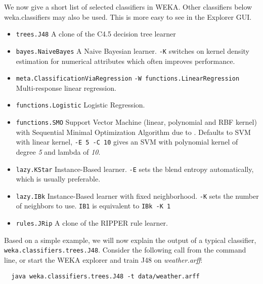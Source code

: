 \vspace{0.5cm}

\noindent We now give a short list of selected classifiers in WEKA. Other classifiers below weka.classifiers may also be used. This is more easy to see in the Explorer GUI.

\begin{itemize}
	\item \texttt{trees.J48} A clone of the C4.5 decision tree learner
	\item \texttt{bayes.NaiveBayes} A Naive Bayesian learner. \texttt{-K} switches on kernel density estimation for numerical attributes which often improves performance.
	\item \texttt{meta.ClassificationViaRegression} \texttt{-W functions.LinearRegression} Multi-response linear regression.
	\item \texttt{functions.Logistic} Logistic Regression.
	\item \texttt{functions.SMO} Support Vector Machine (linear, polynomial and RBF kernel) with Sequential Minimal Optimization Algorithm due to \cite{platt98}. Defaults to SVM with linear kernel, \texttt{-E 5 -C 10} gives an SVM with polynomial kernel of degree \textit{5} and lambda of \textit{10}.
	\item \texttt{lazy.KStar} Instance-Based learner. \texttt{-E} sets the blend entropy automatically, which is usually preferable.
	\item \texttt{lazy.IBk} Instance-Based learner with fixed neighborhood. \texttt{-K} sets the number of neighbors to use. \texttt{IB1} is equivalent to \texttt{IBk -K 1}
	\item \texttt{rules.JRip} A clone of the RIPPER rule learner. 
\end{itemize}

Based on a simple example, we will now explain the output of a typical classifier, \texttt{weka.classifiers.trees.J48}. Consider the following call from the command line, or start the WEKA explorer and train J48 on \textit{weather.arff}:

{\scriptsize
\begin{verbatim}
  java weka.classifiers.trees.J48 -t data/weather.arff
\end{verbatim}}

